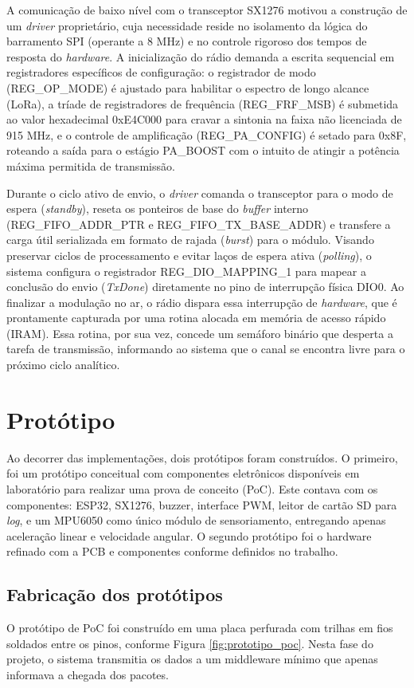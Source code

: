 A comunicação de baixo nível com o transceptor SX1276 motivou a construção de um \textit{driver} proprietário, cuja necessidade reside no isolamento da lógica do barramento SPI (operante a 8 MHz) e no controle rigoroso dos tempos de resposta do \textit{hardware}. A inicialização do rádio demanda a escrita sequencial em registradores específicos de configuração: o registrador de modo (REG\_OP\_MODE) é ajustado para habilitar o espectro de longo alcance (LoRa), a tríade de registradores de frequência (REG\_FRF\_MSB) é submetida ao valor hexadecimal 0xE4C000 para cravar a sintonia na faixa não licenciada de 915 MHz, e o controle de amplificação (REG\_PA\_CONFIG) é setado para 0x8F, roteando a saída para o estágio PA\_BOOST com o intuito de atingir a potência máxima permitida de transmissão.

Durante o ciclo ativo de envio, o \textit{driver} comanda o transceptor para o modo de espera (\textit{standby}), reseta os ponteiros de base do \textit{buffer} interno (REG\_FIFO\_ADDR\_PTR e REG\_FIFO\_TX\_BASE\_ADDR) e transfere a carga útil serializada em formato de rajada (\textit{burst}) para o módulo. Visando preservar ciclos de processamento e evitar laços de espera ativa (\textit{polling}), o sistema configura o registrador REG\_DIO\_MAPPING\_1 para mapear a conclusão do envio (\textit{TxDone}) diretamente no pino de interrupção física DIO0. Ao finalizar a modulação no ar, o rádio dispara essa interrupção de \textit{hardware}, que é prontamente capturada por uma rotina alocada em memória de acesso rápido (IRAM). Essa rotina, por sua vez, concede um semáforo binário que desperta a tarefa de transmissão, informando ao sistema que o canal se encontra livre para o próximo ciclo analítico.

\section{Protótipo}
Ao decorrer das implementações, dois protótipos foram construídos. O primeiro, foi um protótipo conceitual com componentes eletrônicos disponíveis em laboratório para realizar uma prova de conceito (PoC). Este contava com os componentes: ESP32, SX1276, buzzer, interface PWM, leitor de cartão SD para \textit{log}, e um MPU6050 como único módulo de sensoriamento, entregando apenas aceleração linear e velocidade angular. O segundo protótipo foi o hardware refinado com a PCB e componentes conforme definidos no trabalho.

\subsection{Fabricação dos protótipos}
O protótipo de PoC foi construído em uma placa perfurada com trilhas em fios soldados entre os pinos, conforme Figura \ref{fig:prototipo_poc}. Nesta fase do projeto, o sistema transmitia os dados a um middleware mínimo que apenas informava a chegada dos pacotes.

